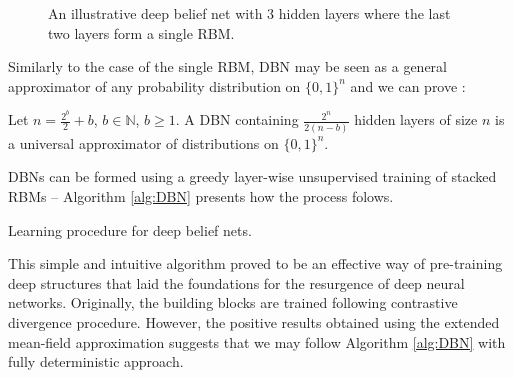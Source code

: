 \begin{figure}[!h]
\begin{center}
  \caption[Deep belief net]{An illustrative deep belief net with $3$ hidden layers where the last two layers form a single RBM.}
    \label{fig:DBN}
\end{center}
\end{figure}

Similarly to the case of the single RBM, DBN may be seen as a general approximator of any probability distribution on $\{0,1 \}^n$ and we can prove \cite{montufar2010refinements}
:
\begin{theorem} [Guido-Ay, 2010] Let $n = \frac{2^b}{2} + b$, $b \in \mathbb{N}$, $b \geqslant 1$. A DBN containing $\frac{2^n}{2(n-b)}$ hidden layers of size $n$ is a universal approximator of distributions on $\{0,1 \}^n$.
\end{theorem}

DBNs can be formed using a greedy layer-wise unsupervised training of stacked RBMs -- Algorithm \ref{alg:DBN} presents how the process folows.
\begin{algorithm}[!bthp]
\caption{Learning procedure for deep belief nets.}
\label{alg:DBN}
\begin{algorithmic}
\EndFor
\end{algorithmic}
\end{algorithm}
This simple and intuitive algorithm proved to be an effective way of pre-training deep structures that laid the foundations for the resurgence of deep neural networks. Originally, the building blocks are trained following contrastive divergence 
procedure.  However, the positive results obtained using the extended mean-field approximation suggests that we may follow Algorithm \ref{alg:DBN} with fully deterministic approach.

